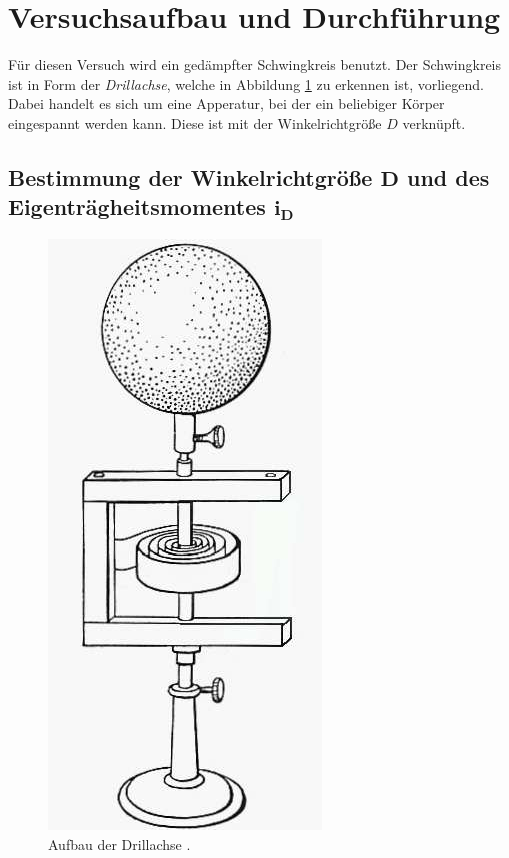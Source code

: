 \section{Versuchsaufbau und Durchführung}
\label{sec:Durchführung}

Für diesen Versuch wird ein gedämpfter Schwingkreis benutzt.
Der Schwingkreis ist in Form der \textit{Drillachse}, welche in Abbildung \ref{fig:drillachse} zu erkennen ist, vorliegend.
Dabei handelt es sich um eine Apperatur, bei der ein beliebiger Körper eingespannt werden kann.
Diese ist mit der Winkelrichtgröße $D$ verknüpft.

\subsection{Bestimmung der Winkelrichtgröße $\pmb{D}$ und des Eigenträgheitsmomentes $\pmb{i_{D}}$} \label{subsec:Winkelrichtgröße}

\begin{figure}[H]
    \centering
    \includegraphics{pictures/Drillachse.png}
    \caption{Aufbau der Drillachse \cite{v101}.}
    \label{fig:drillachse}
\end{figure}


